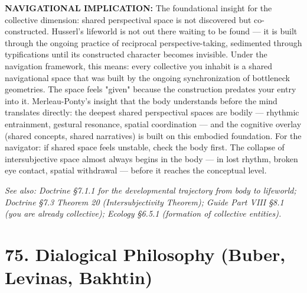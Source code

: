 \textbf{NAVIGATIONAL IMPLICATION:} The foundational insight for the collective dimension: shared perspectival space is not discovered but co-constructed. Husserl's lifeworld is not out there waiting to be found — it is built through the ongoing practice of reciprocal perspective-taking, sedimented through typifications until its constructed character becomes invisible. Under the navigation framework, this means: every collective you inhabit is a shared navigational space that was built by the ongoing synchronization of bottleneck geometries. The space feels "given" because the construction predates your entry into it. Merleau-Ponty's insight that the body understands before the mind translates directly: the deepest shared perspectival spaces are bodily — rhythmic entrainment, gestural resonance, spatial coordination — and the cognitive overlay (shared concepts, shared narratives) is built on this embodied foundation. For the navigator: if shared space feels unstable, check the body first. The collapse of intersubjective space almost always begins in the body — in lost rhythm, broken eye contact, spatial withdrawal — before it reaches the conceptual level.


\textit{See also: Doctrine §7.1.1 for the developmental trajectory from body to lifeworld; Doctrine §7.3 Theorem 20 (Intersubjectivity Theorem); Guide Part VIII §8.1 (you are already collective); Ecology §6.5.1 (formation of collective entities).}


\bigskip\noindent\makebox[\textwidth]{\color{rulegray}\rule{5cm}{0.3pt}}\bigskip


\section*{75. Dialogical Philosophy (Buber, Levinas, Bakhtin)}


